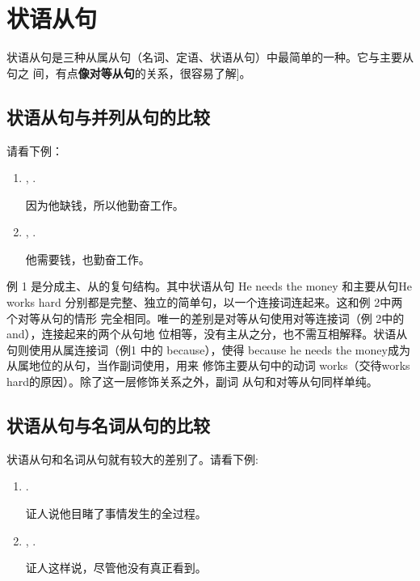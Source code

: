\chapter{状语从句}

状语从句是三种从属从句（名词、定语、状语从句）中最简单的一种。它与主要从句之
间，有点\textbf{像对等从句}的关系，很容易了解]。

\section{状语从句与并列从句的比较}

请看下例：

\begin{enumerate}
\item {} , .

  因为他缺钱，所以他勤奋工作。
\item {},  .

  他需要钱，也勤奋工作。
\end{enumerate}

例 1 是分成主、从的复句结构。其中状语从句 He needs the money 和主要从句He works
hard 分别都是完整、独立的简单句，以一个连接词连起来。这和例 2中两个对等从句的情形
完全相同。唯一的差别是对等从句使用对等连接词（例 2中的and），连接起来的两个从句地
位相等，没有主从之分，也不需互相解释。状语从句则使用从属连接词（例1 中的
because），使得 because he needs the money成为从属地位的从句，当作副词使用，用来
修饰主要从句中的动词 works（交待works hard的原因）。除了这一层修饰关系之外，副词
从句和对等从句同样单纯。

\section{状语从句与名词从句的比较}

状语从句和名词从句就有较大的差别了。请看下例:

\begin{enumerate}
\item {}   .

  证人说他目睹了事情发生的全过程。
\item {}  , 
  .

  证人这样说，尽管他没有真正看到。
\end{enumerate}

